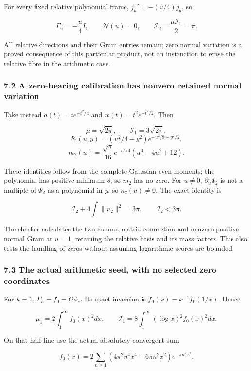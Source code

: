 \documentclass[
]{article}
\begin{document}
For every fixed relative polynomial frame, \(j_u'=-(u/4)j_u\), so

\[\Gamma_u=-\frac u4I,\qquad \mathcal N(u)=0,\qquad
\mathcal I_2=\frac{\mu\mathcal I_1}{2}=\pi.\tag{7.1}\]

All relative directions and their Gram entries remain; zero normal
variation is a proved consequence of this particular product, not an
instruction to erase the relative fibre in the arithmetic case.

\subsubsection{7.2 A zero-bearing calibration has nonzero retained
normal
variation}\label{a-zero-bearing-calibration-has-nonzero-retained-normal-variation}

Take instead \(a(t)=t e^{-t^2/4}\) and \(w(t)=t^2e^{-t^2/2}\). Then

\[\mu=\sqrt{2\pi},\qquad \mathcal I_1=3\sqrt{2\pi},\]
\[\Psi_2(u,y)=(u^2/4-y^2)e^{-u^2/8-y^2/2},\]
\[m_2(u)=\frac{\sqrt\pi}{16}e^{-u^2/4}(u^4-4u^2+12).\tag{7.2}\]

These identities follow from the complete Gaussian even moments; the
polynomial has positive minimum \(8\), so \(m_2\) has no zero. For
\(u\ne0\), \(\partial_u\Psi_2\) is not a multiple of \(\Psi_2\) as a
polynomial in \(y\), so \(n_2(u)\ne0\). The exact identity is

\[\mathcal I_2+4\int\|n_2\|^2=3\pi,\qquad \mathcal I_2<3\pi.\tag{7.3}\]

The checker calculates the two-column matrix connection and nonzero
positive normal Gram at \(u=1\), retaining the relative basis and its
mass factors. This also tests the handling of zeros without assuming
logarithmic scores are bounded.

\subsubsection{7.3 The actual arithmetic seed, with no selected zero
coordinates}\label{the-actual-arithmetic-seed-with-no-selected-zero-coordinates}

For \(h=1\), \(F_h=f_0=\Theta\phi_*\). Its exact inversion is
\(f_0(x)=x^{-1}f_0(1/x)\). Hence

\[\mu_1=2\int_1^\infty f_0(x)^2dx,\qquad
\mathcal I_1=8\int_1^\infty(\log x)^2 f_0(x)^2dx.\tag{7.4}\]

On that half-line use the actual absolutely convergent sum

\[f_0(x)=2\sum_{n\ge1}(4\pi^2n^4x^4-6\pi n^2x^2)e^{-\pi n^2x^2}.\]
\end{document}

